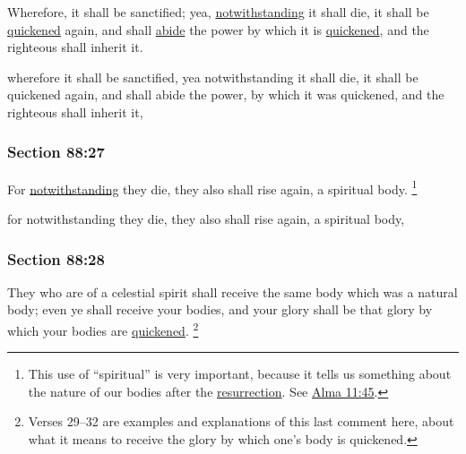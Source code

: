 		Wherefore, it shall be sanctified; yea, \hyperref[notwithstanding]{notwithstanding} it shall die, it shall be \hyperref[QUICKEN]{quickened} again, and shall \hyperref[ABIDE]{abide} the power by which it is \hyperref[QUICKEN]{quickened}, and the righteous shall inherit it.

		\begin{framed}
		\scriptsize
			\begin{compactdesc}
				\item[JSP] wherefore it shall be sanctified, yea notwithstanding it shall die, it shall be quickened again, and shall abide the power, by which it was quickened, and the righteous shall inherit it,
			\end{compactdesc}
		\end{framed}

	\subsubsection{Section 88:27} %
		\label{DC88-27}

		For \hyperref[notwithstanding]{notwithstanding} they die, they also shall rise again, a spiritual body.%
			\footnote{%
				This use of ``spiritual'' is very important, because it tells us something about the nature of our bodies after the \hyperref[RESURRECTION]{resurrection}. See \hyperref[ALMA-11-45]{Alma 11:45}.
				}

		\begin{framed}
		\scriptsize
			\begin{compactdesc}
				\item[JSP] for notwithstanding they die, they also shall rise again, a spiritual body,
			\end{compactdesc}
		\end{framed}

	\subsubsection{Section 88:28} %
		\label{DC88-28}

		They who are of a celestial spirit shall receive the same body which was a natural body; even ye shall receive your bodies, and your glory shall be that glory by which your bodies are \hyperref[QUICKEN]{quickened}.%
			\footnote{%
				Verses 29--32 are examples and explanations of this last comment here, about what it means to receive the glory by which one's body is quickened.
				}

